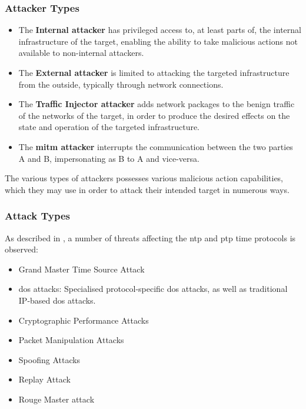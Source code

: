 \subsubsection{Attacker Types}

\begin{itemize}
    \item The \textbf{Internal attacker} has privileged access to, at least parts of, the internal infrastructure of the target, enabling the ability to take malicious actions not available to non-internal attackers.
    \item The \textbf{External attacker} is limited to attacking the targeted infrastructure from the outside, typically through network connections.
    \item The \textbf{Traffic Injector attacker} adds network packages to the benign traffic of the networks of the target, in order to produce the desired effects on the state and operation of the targeted infrastructure. 
    \item The \textbf{\acrshort{mitm} attacker} interrupts the communication between the two parties A and B, impersonating as B to A and vice-versa.
\end{itemize}



The various types of attackers possesses various malicious action capabilities, which they may use in order to attack their intended target in numerous ways.


\subsubsection{Attack Types}
As described in \cite{mizrahi2014security}, a number of threats affecting the \acrshort{ntp} and  \acrshort{ptp} time protocols is observed:



\begin{itemize}
    \item Grand Master Time Source Attack
    \item \acrfull{dos} attacks: Specialised protocol-specific \acrshort{dos} attacks, as well as traditional IP-based \acrshort{dos} attacks.
    \item Cryptographic Performance Attacks
    \item Packet Manipulation Attacks
    \item Spoofing Attacks
    \item Replay Attack   
    \item Rouge Master attack 
\end{itemize}






